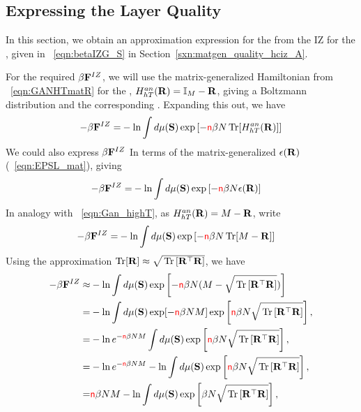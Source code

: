 \subsection{Expressing the Layer Quality}
\label{sxn:quality}

In this section, we obtain an approximation expression for the \LayerQualitySquared from the IZ \FreeEnergy for the \GeneralizationError, 
given in \EQN~\ref{eqn:betaIZG_S} in Section~\ref{sxn:matgen_quality_hciz_A}.

For the required \FreeEnergy $\beta\mathbf{F}^{IZ}$, we will use the matrix-generalized Hamiltonian
from \EQN~\ref{eqn:GANHTmatR} for the
\LayerQuality, $H^{an}_{hT}(\mathbf{R})=\mathbb{I}_{M}-\mathbf{R}$,
giving a Boltzmann distribution and the corresponding \ThermalAverage.  
Expanding this out, we have
\begin{align}
  \label{eqn:IZFE0}
  -\beta\mathbf{F}^{IZ} =& -  \ln \int d\mu(\mathbf{S}) \exp\left[-{\color{red}\sf{n}}\beta N \operatorname{Tr}[H^{an}_{hT}(\mathbf{R})]  \right] \\
\end{align}
We could also express $\beta\mathbf{F}^{IZ}$ In terms of the matrix-generalized \EffectivePotential $\epsilon(\mathbf{R})$
(\EQN~\ref{eqn:EPSL_mat}), giving
\begin{align}
  -\beta\mathbf{F}^{IZ} =& -  \ln \int d\mu(\mathbf{S}) \exp\left[-{\color{red}\sf{n}}\beta N \epsilon(\mathbf{R})  \right] 
\end{align}
In analogy with \EQN~\ref{eqn:Gan_highT}, 
as $H^{an}_{hT}(\mathbf{R})=M-\mathbf{R}$,  write
\begin{align}
-\beta\mathbf{F}^{IZ}  =& -  \ln \int d\mu(\mathbf{S}) \exp\left[-{\color{red}\sf{n}}\beta N \operatorname{Tr}[M-\mathbf{R}]  \right] 
\end{align}
Using the approximation $\operatorname{Tr}[\mathbf{R}]\approx\sqrt{\mbox{}\operatorname{Tr}\left[\mathbf{R}^{\top}\mathbf{R}\right]}$, we have
\begin{align}
  -\beta\mathbf{F}^{IZ} 
\approx& - \ln \int d\mu(\mathbf{S}) \exp\left[-{\color{red}\sf{n}}\beta N(M-\sqrt{\mbox{}\operatorname{Tr}\left[\mathbf{R}^{\top}\mathbf{R}\right]} ) \right] \\ 
\label{eqn:IZFE1}
=& -  \ln \int d\mu(\mathbf{S}) \exp[-{\color{red}\sf{n}}\beta NM]\exp\left[{\color{red}\sf{n}}\beta N\sqrt{\mbox{}\operatorname{Tr}\left[\mathbf{R}^{\top}\mathbf{R}\right]}\right], \\
\label{eqn:IZFE2}
=& -  \ln e^{-{\color{red}\sf{n}}\beta NM} \int d\mu(\mathbf{S}) \exp\left[{\color{red}\sf{n}}\beta N\sqrt{\mbox{}\operatorname{Tr}\left[\mathbf{R}^{\top}\mathbf{R}\right]}\right], \\
\label{eqn:IZFE3}
=& -  \ln e^{-{\color{red}\sf{n}}\beta NM} - \ln \int d\mu(\mathbf{S}) \exp\left[{\color{red}\sf{n}}\beta N\sqrt{\mbox{}\operatorname{Tr}\left[\mathbf{R}^{\top}\mathbf{R}\right]}\right], \\
\label{eqn:IZFE4}
=& {\color{red}\sf{n}}\beta NM - \ln \int d\mu(\mathbf{S}) \exp\left[\beta N\sqrt{\mbox{}\operatorname{Tr}\left[\mathbf{R}^{\top}\mathbf{R}\right]}\right], 
\end{align}

